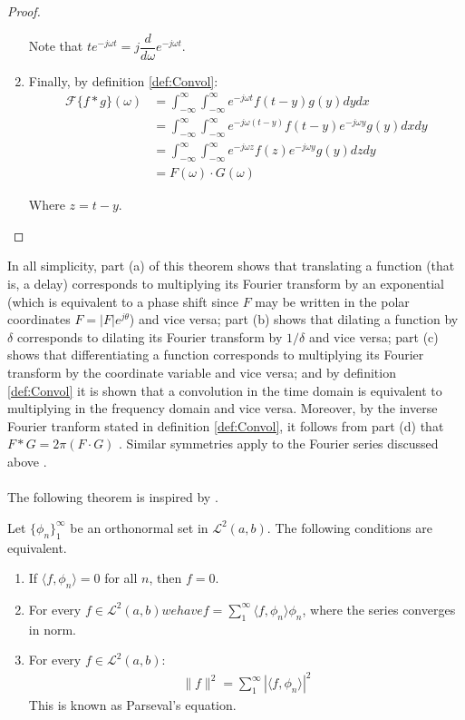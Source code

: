 \begin{proof}
\begin{enumerate}[label=(\alph*)]
Note that $t e^{-j \omega t} = j \dfrac{d}{d\omega} e^{-j\omega t}$.

\item Finally, by definition \ref{def:Convol}:
\begin{align*}
\mathcal{F}\{f*g\}(\omega) &= \int_{-\infty}^\infty \int_{-\infty}^\infty e^{-j \omega t} f(t - y) g(y) dy dx \\
&= \int_{-\infty}^\infty \int_{-\infty}^\infty e^{-j\omega(t-y)} f(t-y) e^{-j\omega y} g(y) dx dy \\
&= \int_{-\infty}^\infty \int_{-\infty}^\infty e^{-j\omega z} f(z) e^{-j\omega y} g(y) dz dy \\
&= F(\omega) \cdot G(\omega)
\end{align*}

Where $z = t - y$.
\end{enumerate}
\end{proof}

\noindent
In all simplicity, part (a) of this theorem shows that translating a function (that is, a delay) corresponds to multiplying its Fourier transform by an exponential (which is equivalent to a phase shift since $F$ may be written in the polar coordinates $F = |F|e^{j\theta}$) and vice versa; part (b) shows that dilating a function by $\delta$ corresponds to dilating its Fourier transform by $1/\delta$ and vice versa; part (c) shows that differentiating a function corresponds to multiplying its Fourier transform by the coordinate variable and vice versa; and by definition \ref{def:Convol} it is shown that a convolution in the time domain is equivalent to multiplying in the frequency domain and vice versa. Moreover, by the inverse Fourier tranform stated in definition \ref{def:Convol}, it follows from part (d) that $F*G = 2 \pi (F \cdot G)$ \cite{ page 215, FAA}. Similar symmetries apply to the Fourier series discussed above \cite{page 60, DTSP}.
\\ \\
The following theorem is inspired by \cite{page 77, FAA}.

\begin{theorem}
Let $\{\phi_n\}_1^\infty$ be an orthonormal set in $\mathcal{L}^2(a,b)$. The following conditions are equivalent.
\begin{enumerate}[label=(\alph*)]
\item If $\langle f, \phi_n \rangle = 0$ for all $n$, then $f = 0$.
\item For every $f \in \mathcal{L}^2(a,b) we have f = \sum_1^\infty \langle f, \phi_n \rangle \phi_n$, where the series converges in norm.\\
\item For every $f \in \mathcal{L}^2(a,b)$:
\begin{align*}
\|f\|^2 = \sum_1^\infty |\langle f,\phi_n \rangle|^2
\end{align*}
This is known as Parseval's equation.
\end{enumerate}
\end{theorem}

